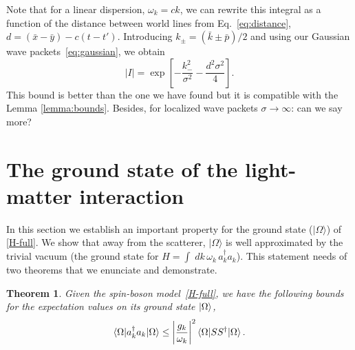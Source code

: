 \documentclass[notitlepage, prx, preprint, amsmath,superscriptaddress,amssymb]{revtex4-1}
\newtheorem{theorem}{Theorem}[section]
\begin{document}
Note that for a linear dispersion, $\omega_k=c k$, we can rewrite this integral as a function of the distance between world lines from Eq.\ \eqref{eq:distance}, $d=(\bar x-\bar y)-c(t-t')$.
Introducing $k_{\pm}=(\bar k \pm \bar p)/2$ and using our Gaussian wave packets\ \eqref{eq:gaussian}, we obtain
\begin{equation}
|I| = \exp\left[-\frac{k_-^2}{\sigma^2}-\frac{d^2\sigma^2}{4}\right].
\label{eq:free-commutator}
\end{equation}
This bound is better than the one we have found but it is compatible with the Lemma \ref{lemma:bounds}.
{\color{red} Besides, for localized wave packets $\sigma \to \infty$: can we say more?}



\section{The ground state of the light-matter interaction}


In this section we establish an important property for the ground state ($|\Omega\rangle$)   of \eqref{H-full}.  We show that  away from the scatterer,  $|\Omega\rangle$ is well approximated by the trivial vacuum  (the ground state for $H= \int \; dk \, \omega_k \, a_k^\dagger a_k$).  This statement needs of two theorems that we enunciate and demonstrate.


\begin{theorem}
\label{th:bound-a}
Given the spin-boson model\ \eqref{H-full}, we have the following bounds for the expectation values on its ground state $\ket{\Omega}$,
\begin{equation}
\label{bound-nk}
\braket{\Omega|a_k^{\dagger}a_k|\Omega} \leq \left|\frac{g_k}{\omega_k}\right|^{2}
\braket{\Omega|S S^\dagger |\Omega} .
\end{equation}
\end{theorem}
\end{document}
